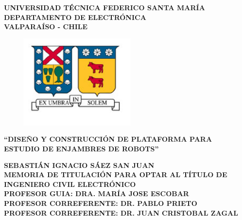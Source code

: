 \documentclass[11pt, a4paper, oneside]{Thesis} %
\begin{document}
\begin{titlepage}

\thispagestyle{empty}

\begin{center}
\linespread{1.15}
\textbf{\large{UNIVERSIDAD TÉCNICA FEDERICO SANTA MARÍA\\}
\normalsize{DEPARTAMENTO DE ELECTRÓNICA\\VALPARAÍSO - CHILE\\}}

\vspace{0.5cm}
\begin{figure}[!ht]
\centering
  \includegraphics[width=5.85cm]{./Figures/usmLogo.png}
\end{figure}
\vspace{0.5cm}

\linespread{1}\hangindent=0cm
\textbf{\Large ``DISEÑO Y CONSTRUCCIÓN DE PLATAFORMA PARA ESTUDIO DE ENJAMBRES DE ROBOTS''\\}
\vspace{3cm}

\hangindent=0cm\large \textbf{SEBASTIÁN IGNACIO SÁEZ SAN JUAN}\\
\vspace{0.5cm}
\hangindent=0cm\normalsize \textbf{MEMORIA DE TITULACIÓN PARA OPTAR AL TÍTULO DE INGENIERO CIVIL ELECTRÓNICO}\\
\vspace{3cm}
\hangindent=0cm\normalsize \textbf{PROFESOR GUIA: \hspace{1cm} DRA. MARÍA JOSE ESCOBAR}\\
\vspace{0.5cm}
\hangindent=0cm\normalsize \textbf{PROFESOR CORREFERENTE: \hspace{1cm} DR. PABLO PRIETO}\\
\vspace{0.5cm}
\hangindent=0cm\normalsize \textbf{PROFESOR CORREFERENTE: \hspace{1cm} DR. JUAN CRISTOBAL ZAGAL}\\



\end{center}
\end{titlepage}
\end{document}
